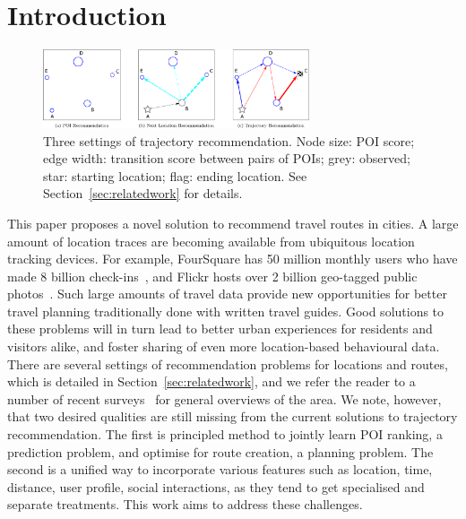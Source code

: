 
\section{Introduction}
\label{sec:intro}

\begin{figure}[ht]
	\centering
	\includegraphics[width=0.7\textwidth]{fig/fig1-flavours.pdf}
	\caption{Three settings of trajectory recommendation.%
Node size: POI score; edge width: transition score between pairs of POIs; 
grey: observed;
star: starting location; flag: ending location. See Section~\ref{sec:relatedwork} for details.
}
	\label{fig:threesettings}
\end{figure}


This paper proposes a novel solution to recommend travel routes in cities.
A large amount of location traces are becoming available from ubiquitous location tracking devices.
For example, FourSquare
has 50 million monthly users who have made 8 billion check-ins~\cite{4sq},
and Flickr
hosts over 2 billion geo-tagged public photos~\cite{flickr}. 
Such large amounts of travel data provide new opportunities for better
travel planning traditionally done with written travel guides.
Good solutions to these problems will in turn lead to better urban experiences for residents and visitors alike, and foster sharing of even more location-based behavioural data.
%
There are several settings of recommendation problems for locations and routes,
which is detailed in Section~\ref{sec:relatedwork}, and we refer the reader to a number of recent
surveys~\cite{bao2015recommendations,zheng2015trajectory,zheng2014urban}
for general overviews of the area. %
We note, however, that two desired qualities are still 
missing from the current solutions to trajectory recommendation. 
The first is principled method to jointly learn POI ranking, a prediction problem, 
and optimise for route creation, a planning problem. 
The second is a unified way to incorporate various features 
such as location, time, distance, user profile, social interactions, 
as they tend to get specialised and separate treatments. 
This work aims to address these challenges. %

